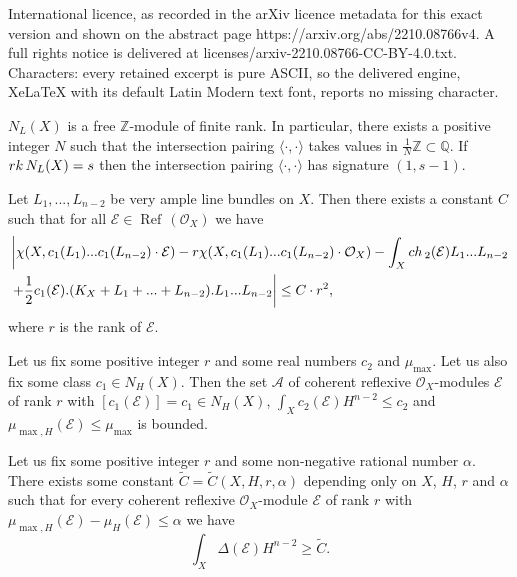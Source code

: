\documentclass[10pt,a4paper]{amsart}
\newcommand{\QQ}{{\mathbb Q}}
\newcommand{\Refl}{{\mathop{\operatorname{Ref}\, }}}
\newcommand{\ZZ}{{\mathbb Z}}
\newcommand{\cA}{{\mathcal A}}
\newcommand{\cE}{{\mathcal E}}
\newcommand{\cO}{{\mathcal O}}
\newcommand{\ch}{{\mathop{\rm ch \, }}}
\newcommand{\rk}{{\mathop{\rm rk \,}}}
\begin{document}
International licence, as recorded in the arXiv licence metadata for this exact version and shown on the abstract page https://arxiv.org/abs/2210.08766v4. A full rights notice is delivered at licenses/arxiv-2210.08766-CC-BY-4.0.txt. Characters: every retained excerpt is pure ASCII, so the delivered engine, XeLaTeX with its default Latin Modern text font, reports no missing character.
\begin{Lemma}\label{finite-generation}
$N_L(X)$ is a free $\ZZ$-module of finite rank. In particular, there exists a positive integer $N$ such that the intersection pairing $\langle \cdot , \cdot \rangle$ takes values in $\frac{1}{N}\ZZ\subset \QQ$.  If  $\rk N_L (X)=s$ then the intersection pairing $\langle \cdot , \cdot \rangle$ has signature $(1, s-1)$.
\end{Lemma} 

\begin{Theorem}\label{main-consequence}
Let  $L_1, ..., L_{n-2}$ be very ample line bundles on $X$. Then there exists a constant $C$ such that for all
$\cE\in \Refl(\cO_X)$ we have
\begin{align*}
&\left\lvert \chi (X, c_1(L_1)... c_1(L_{n-2}) \cdot \cE) -r\chi (X, c_1(L_1)... c_1(L_{n-2}) \cdot \cO_X) -  \int _X \ch _2 (\cE)L_1...L_{n-2}  \right. \\
 & \left. +\frac{1}{2}   c_1(\cE).(K_X+L_1+...+L_{n-2}). L_1...L_{n-2} 
\right\rvert \le C\cdot r^2,
    \end{align*}
where $r$ is the rank of $\cE$.
\end{Theorem}

\begin{Theorem} \label{boundedness-3}
Let us fix some positive integer $r$  and some real
numbers $c_2$ and $\mu _{\max}$. Let us also fix some class $c_1\in N_H(X)$.
Then the set $\cA$ of coherent reflexive $\cO_X$-modules $\cE$ of rank $r$ with $[c_1(\cE)]=c_1\in N_H(X)$,
$\int _X c_2 (\cE) H^{n-2}\le c_2$  and $\mu _{\max ,H } (\cE)\le \mu _{\max}$
is bounded.
\end{Theorem}

\begin{Theorem}\label{Bogomolov's-inequality}
Let us fix some positive integer $r$ and some non-negative rational number $\alpha$.
There exists some constant $\tilde C=\tilde C(X,H,r,\alpha)$ depending only on $X$, $H$, $r$ and $\alpha$ such that for every coherent
reflexive    $\cO_X$-module $\cE$ of rank $r$ with
$\mu _{\max ,H } (\cE)-\mu _H (\cE)\le \alpha$ we have
$$\int _X \Delta (\cE) H^{n-2}\ge \tilde C.$$
\end{Theorem}
\end{document}
